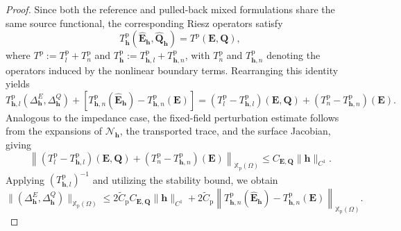 \documentclass[10pt,a4paper]{amsart}
\numberwithin{equation}{section}
\begin{document}
\begin{proof}
Since both the reference and pulled-back mixed formulations share the same source functional, the corresponding Riesz operators satisfy
\[
T_{\mathbf{h}}^{\mathrm{p}} (\hat{\mathbf{E}}_{\mathbf{h}}, \hat{\mathbf{Q}}_{\mathbf{h}}) = T^{\mathrm{p}}(\mathbf{E}, \mathbf{Q}),
\]
where $T^{\mathrm{p}} := T_l^{\mathrm{p}} + T_n^{\mathrm{p}}$ and $T_{\mathbf{h}}^{\mathrm{p}} := T_{\mathbf{h},l}^{\mathrm{p}} + T_{\mathbf{h},n}^{\mathrm{p}}$, with $T_n^{\mathrm{p}}$ and $T_{\mathbf{h},n}^{\mathrm{p}}$ denoting the operators induced by the nonlinear boundary terms. Rearranging this identity yields
\[
T_{\mathbf{h},l}^{\mathrm{p}}(\Delta_{\mathbf{h}}^E, \Delta_{\mathbf{h}}^Q) + \left[ T_{\mathbf{h},n}^{\mathrm{p}}(\hat{\mathbf{E}}_{\mathbf{h}}) - T_{\mathbf{h},n}^{\mathrm{p}}(\mathbf{E}) \right] = (T_l^{\mathrm{p}} - T_{\mathbf{h},l}^{\mathrm{p}})(\mathbf{E}, \mathbf{Q}) + (T_n^{\mathrm{p}} - T_{\mathbf{h},n}^{\mathrm{p}})(\mathbf{E}).
\]
Analogous to the impedance case, the fixed-field perturbation estimate follows from the expansions of $\mathcal{N}_{\mathbf{h}}$, the transported trace, and the surface Jacobian, giving
\[
\left\| (T_l^{\mathrm{p}} - T_{\mathbf{h},l}^{\mathrm{p}})(\mathbf{E}, \mathbf{Q}) + (T_n^{\mathrm{p}} - T_{\mathbf{h},n}^{\mathrm{p}})(\mathbf{E}) \right\|_{\mathbb{X}_{\mathrm{p}}(\Omega)} \le C_{\mathbf{E}, \mathbf{Q}} \|\mathbf{h}\|_{C^1}.
\]
Applying $(T_{\mathbf{h},l}^{\mathrm{p}})^{-1}$ and utilizing the stability bound, we obtain
\begin{equation} \label{eq:NPEC_stability_intermediate}
\|(\Delta_{\mathbf{h}}^E, \Delta_{\mathbf{h}}^Q)\|_{\mathbb{X}_{\mathrm{p}}(\Omega)} \le 2\widetilde{C}_{\mathrm{p}} C_{\mathbf{E}, \mathbf{Q}} \|\mathbf{h}\|_{C^1} + 2\widetilde{C}_{\mathrm{p}} \left\| T_{\mathbf{h},n}^{\mathrm{p}}(\hat{\mathbf{E}}_{\mathbf{h}}) - T_{\mathbf{h},n}^{\mathrm{p}}(\mathbf{E}) \right\|_{\mathbb{X}_{\mathrm{p}}(\Omega)}.
\end{equation}


\end{proof}
\end{document}
